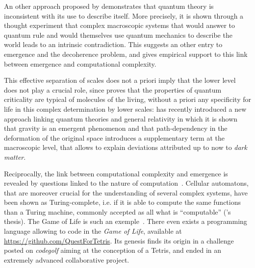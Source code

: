 An other approach proposed by \cite{frauchiger2018quantum} demonstrates that quantum theory is inconsistent with its use to describe itself. More precisely, it is shown through a thought experiment that complex macroscopic systems that would answer to quantum rule and would themselves use quantum mechanics to describe the world leads to an intrinsic contradiction. This suggests an other entry to emergence and the decoherence problem, and gives empirical support to this link between emergence and computational complexity.


This effective separation of scales does not a priori imply that the lower level does not play a crucial role, since \cite{vattay2015quantum} proves that the properties of quantum criticality are typical of molecules of the living, without a priori any specificity for life in this complex determination by lower scales: \cite{2016arXiv161102269V} has recently introduced a new approach linking quantum theories and general relativity in which it is shown that gravity is an emergent phenomenon and that path-dependency in the deformation of the original space introduces a supplementary term at the macroscopic level, that allows to explain deviations attributed up to now to \emph{dark matter}.




Reciprocally, the link between computational complexity and emergence is revealed by questions linked to the nature of computation~\cite{moore2011nature}. Cellular automatons, that are moreover crucial for the understanding of several complex systems, have been shown as Turing-complete, i.e. if it is able to compute the same functions than a Turing machine, commonly accepted as all what is ``computable'' ('s thesis). The Game of Life is such an exemple~\cite{beer2004autopoiesis}. There even exists a programming language allowing to code in the \emph{Game of Life}, available at \url{https://github.com/QuestForTetris}. Its genesis finds its origin in a challenge posted on \emph{codegolf} aiming at the conception of a Tetris, and ended in an extremely advanced collaborative project.


